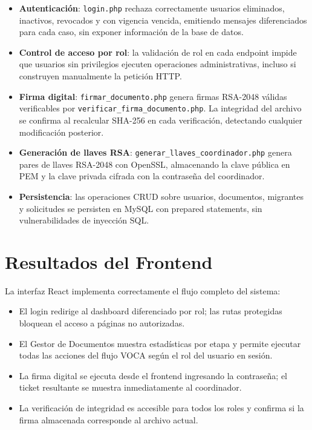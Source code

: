 \documentclass[10pt,letterpaper]{report}
\begin{document}
\begin{itemize}
  \item \textbf{Autenticación}: \texttt{login.php} rechaza correctamente usuarios eliminados, inactivos, revocados y con vigencia vencida, emitiendo mensajes diferenciados para cada caso, sin exponer información de la base de datos.
  \item \textbf{Control de acceso por rol}: la validación de rol en cada endpoint impide que usuarios sin privilegios ejecuten operaciones administrativas, incluso si construyen manualmente la petición HTTP.
  \item \textbf{Firma digital}: \texttt{firmar\_documento.php} genera firmas RSA-2048 válidas verificables por \texttt{verificar\_firma\_documento.php}. La integridad del archivo se confirma al recalcular SHA-256 en cada verificación, detectando cualquier modificación posterior.
  \item \textbf{Generación de llaves RSA}: \texttt{generar\_llaves\_coordinador.php} genera pares de llaves RSA-2048 con OpenSSL, almacenando la clave pública en PEM y la clave privada cifrada con la contraseña del coordinador.
  \item \textbf{Persistencia}: las operaciones CRUD sobre usuarios, documentos, migrantes y solicitudes se persisten en MySQL con prepared statements, sin vulnerabilidades de inyección SQL.
\end{itemize}

\section{Resultados del Frontend}

La interfaz React implementa correctamente el flujo completo del sistema:

\begin{itemize}
  \item El login redirige al dashboard diferenciado por rol; las rutas protegidas bloquean el acceso a páginas no autorizadas.
  \item El Gestor de Documentos muestra estadísticas por etapa y permite ejecutar todas las acciones del flujo VOCA según el rol del usuario en sesión.
  \item La firma digital se ejecuta desde el frontend ingresando la contraseña; el ticket resultante se muestra inmediatamente al coordinador.
  \item La verificación de integridad es accesible para todos los roles y confirma si la firma almacenada corresponde al archivo actual.
\end{itemize}
\end{document}
